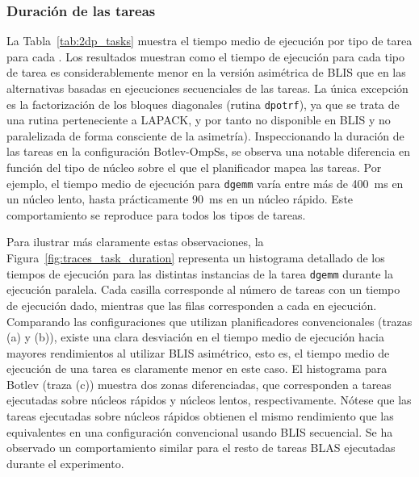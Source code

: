 \subsubsection{Duración de las tareas}
 
La Tabla~\ref{tab:2dp_tasks} muestra el tiempo medio de ejecución por tipo de tarea para cada \wt.
Los resultados muestran como el tiempo de ejecución para cada tipo de tarea es considerablemente menor
en la versión asimétrica de BLIS que en las alternativas basadas en ejecuciones secuenciales de las
tareas. La única excepción es la factorización de los bloques diagonales (rutina {\tt dpotrf}), ya que
se trata de una rutina perteneciente a LAPACK, y por tanto no disponible en BLIS y no paralelizada de forma
consciente de la asimetría). Inspeccionando la duración de las tareas en la configuración Botlev-OmpSs, 
se observa una notable diferencia en función del tipo de núcleo sobre el que el planificador mapea las tareas. Por
ejemplo, el tiempo medio de ejecución para {\tt dgemm} varía entre más de 400~ms en un núcleo lento, hasta prácticamente
90~ms en un núcleo rápido. Este comportamiento se reproduce para todos los tipos de tareas.

Para ilustrar más claramente estas observaciones, la Figura~\ref{fig:traces_task_duration} representa un histograma
detallado de los tiempos de ejecución para las distintas instancias de la tarea {\tt dgemm} durante la ejecución
paralela. Cada casilla corresponde al número de tareas con un tiempo de ejecución dado, mientras que las filas corresponden
a cada \wt en ejecución.
Comparando las configuraciones que utilizan planificadores convencionales (trazas (a) y (b)),
existe una clara desviación en el tiempo medio de ejecución hacia mayores rendimientos al utilizar
BLIS asimétrico, esto es, el tiempo medio de ejecución de una tarea es claramente menor en este caso. El histograma para Botlev (traza (c))
muestra dos zonas diferenciadas, que corresponden a tareas ejecutadas sobre núcleos rápidos y núcleos lentos, respectivamente. Nótese que
las tareas ejecutadas sobre núcleos rápidos obtienen el mismo rendimiento que las equivalentes en una configuración convencional
usando BLIS secuencial. Se ha observado un comportamiento similar para el resto de tareas BLAS ejecutadas durante el experimento.

